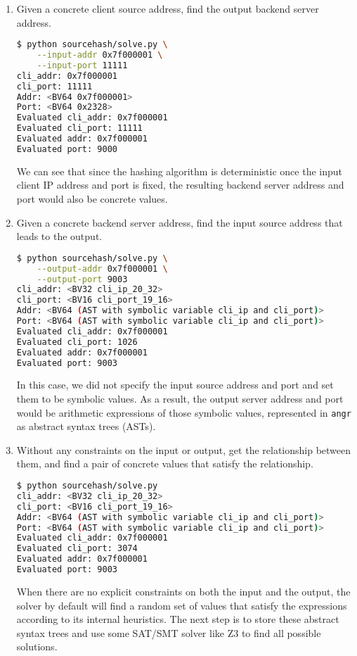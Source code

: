 \begin{enumerate}
    \item Given a concrete client source address, find the output backend server
        address.

\begin{lstlisting}[language=bash]
$ python sourcehash/solve.py \
    --input-addr 0x7f000001 \
    --input-port 11111
cli_addr: 0x7f000001
cli_port: 11111
Addr: <BV64 0x7f000001>
Port: <BV64 0x2328>
Evaluated cli_addr: 0x7f000001
Evaluated cli_port: 11111
Evaluated addr: 0x7f000001
Evaluated port: 9000
\end{lstlisting}

        We can see that since the hashing algorithm is deterministic once the
        input client IP address and port is fixed, the resulting backend server
        address and port would also be concrete values.

    \item Given a concrete backend server address, find the input source address
        that leads to the output.

\begin{lstlisting}[language=bash]
$ python sourcehash/solve.py \
    --output-addr 0x7f000001 \
    --output-port 9003
cli_addr: <BV32 cli_ip_20_32>
cli_port: <BV16 cli_port_19_16>
Addr: <BV64 (AST with symbolic variable cli_ip and cli_port)>
Port: <BV64 (AST with symbolic variable cli_ip and cli_port)>
Evaluated cli_addr: 0x7f000001
Evaluated cli_port: 1026
Evaluated addr: 0x7f000001
Evaluated port: 9003
\end{lstlisting}

        In this case, we did not specify the input source address and port and
        set them to be symbolic values. As a result, the output server address
        and port would be arithmetic expressions of those symbolic values,
        represented in \texttt{angr} as abstract syntax trees (ASTs).

    \item Without any constraints on the input or output, get the relationship
        between them, and find a pair of concrete values that satisfy the
        relationship.

\begin{lstlisting}[language=bash]
$ python sourcehash/solve.py
cli_addr: <BV32 cli_ip_20_32>
cli_port: <BV16 cli_port_19_16>
Addr: <BV64 (AST with symbolic variable cli_ip and cli_port)>
Port: <BV64 (AST with symbolic variable cli_ip and cli_port)>
Evaluated cli_addr: 0x7f000001
Evaluated cli_port: 3074
Evaluated addr: 0x7f000001
Evaluated port: 9003
\end{lstlisting}

        When there are no explicit constraints on both the input and the output,
        the solver by default will find a random set of values that satisfy the
        expressions according to its internal heuristics. The next step is to
        store these abstract syntax trees and use some SAT/SMT solver like Z3 to
        find all possible solutions.
\end{enumerate}


